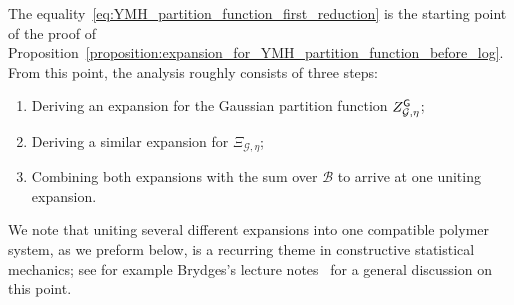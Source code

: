 \documentclass[11pt]{article}
\theoremstyle{definition}
\theoremstyle{remark}
\numberwithin{theorem}{section}
\begin{document}
    The equality~\eqref{eq:YMH_partition_function_first_reduction} is the starting point of the proof of Proposition~\ref{proposition:expansion_for_YMH_partition_function_before_log}. From this point, the analysis roughly consists of three steps: 
    \begin{enumerate}
        \item Deriving an expansion for the Gaussian partition function $Z_{\mathcal{G},\eta}^{\sf G}$;
        \item Deriving a similar expansion for $\Xi_{\mathcal{G},\eta}$;
        \item Combining both expansions with the sum over $\mathcal{B}$ to arrive at one uniting expansion. 
    \end{enumerate}
    We note that uniting several different expansions into one compatible polymer system, as we preform below, is a recurring theme in constructive statistical mechanics; see for example Brydges's lecture notes~\cite[page~157]{Brydges-course} for a general discussion on this point.
    
\end{document}
